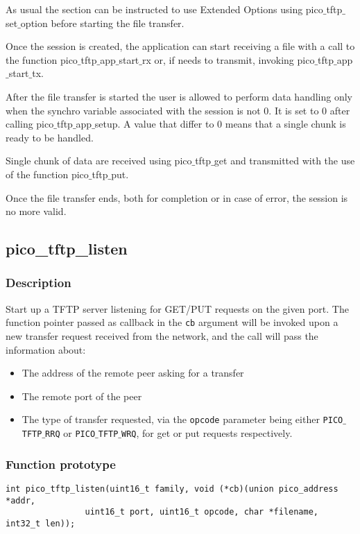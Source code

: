 As usual the section can be instructed to use Extended Options using pico$\_$tftp$\_$set$\_$option before starting the file transfer.

Once the session is created, the application can start receiving a file with a call to the function pico$\_$tftp$\_$app$\_$start$\_$rx or, if needs to transmit, invoking  pico$\_$tftp$\_$app$\_$start$\_$tx.

After the file transfer is started the user is allowed to perform data handling only when the synchro variable associated with the session is not 0. It is set to 0 after calling pico$\_$tftp$\_$app$\_$setup. A value that differ to 0 means that a single chunk is ready to be handled.

Single chunk of data are received using pico$\_$tftp$\_$get and transmitted with the use of the function pico$\_$tftp$\_$put.

Once the file transfer ends, both for completion or in case of error, the session is no more valid.


\subsection{pico\_tftp\_listen}

\subsubsection*{Description}
Start up a TFTP server listening for GET/PUT requests on the given port.
The function pointer passed as callback in the \texttt{cb} argument will be invoked upon a new
transfer request received from the network, and the call will pass the information about:
\begin{itemize}[noitemsep]
\item The address of the remote peer asking for a transfer
\item The remote port of the peer
\item The type of transfer requested, via the \texttt{opcode} parameter being either \texttt{PICO$\_$TFTP$\_$RRQ} or \texttt{PICO$\_$TFTP$\_$WRQ}, for get or put requests respectively.
\end{itemize}

\subsubsection*{Function prototype}
\begin{verbatim}
int pico_tftp_listen(uint16_t family, void (*cb)(union pico_address *addr,
                uint16_t port, uint16_t opcode, char *filename, int32_t len));
\end{verbatim}

